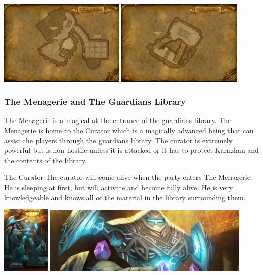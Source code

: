 \begin{center}
	\includegraphics[width=0.45\textwidth]{img/Karazhan/cropped-3457-7.jpg} \includegraphics[width=0.45\textwidth]{img/Karazhan/cropped-3457-8.jpg}
\end{center}

\subsubsection{The Menagerie and The Guardians Library}

The Menagerie is a magical at the entrance of the guardians library. The Menagerie is home to the Curator which is a magically advanced being that can assist the players through the guardians library. The curator is extremely powerful but is non-hostile unless it is attacked or it has to protect Karazhan and the contents of the library.

\begin{commentbox}{The Curator}
	The curator will come alive when the party enters The Menagerie. He is sleeping at first, but will activate and become fully alive. He is very knowledgeable and knows all of the material in the library surrounding them. 
	
	\begin{center}
		\includegraphics[width=0.17\textwidth]{img/Karazhan/400px-The_Curator_full.jpg} \includegraphics[width=0.74\textwidth]{img/Karazhan/featured-thecurator.jpg}
	\end{center}
\end{commentbox}


